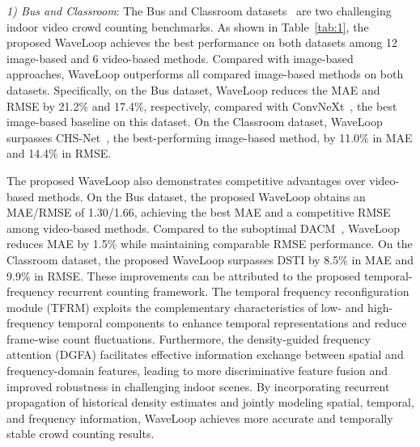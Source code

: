 \documentclass[lettersize,journal]{IEEEtran}
\begin{document}
\textit{1) Bus and Classroom}:
The Bus and Classroom datasets~\cite{ling2023motional} are two challenging indoor video crowd counting benchmarks. As shown in Table~\ref{tab:1}, the proposed WaveLoop achieves the best performance on both datasets among 12 image-based and 6 video-based methods. Compared with image-based approaches, WaveLoop outperforms all compared image-based methods on both datasets. Specifically, on the Bus dataset, WaveLoop reduces the MAE and RMSE by 21.2\% and 17.4\%, respectively, compared with ConvNeXt~\cite{liu2022convnet}, the best image-based baseline on this dataset. On the Classroom dataset, WaveLoop surpasses CHS-Net~\cite{dai2023cross}, the best-performing image-based method, by 11.0\% in MAE and 14.4\% in RMSE.

The proposed WaveLoop also demonstrates competitive advantages over video-based methods. On the Bus dataset, the proposed WaveLoop obtains an MAE/RMSE of 1.30/1.66, achieving the best MAE and a competitive RMSE among video-based methods. Compared to the suboptimal DACM~\cite{ling2025dual}, WaveLoop reduces MAE by 1.5\% while maintaining comparable RMSE performance. On the Classroom dataset, the proposed WaveLoop surpasses DSTI\cite{ling2026dual} by 8.5\% in MAE and 9.9\% in RMSE. These improvements can be attributed to the proposed temporal-frequency recurrent counting framework. The temporal frequency reconfiguration module (TFRM) exploits the complementary characteristics of low- and high-frequency temporal components to enhance temporal representations and reduce frame-wise count fluctuations. Furthermore, the density-guided frequency attention (DGFA) facilitates effective information exchange between spatial and frequency-domain features, leading to more discriminative feature fusion and improved robustness in challenging indoor scenes. By incorporating recurrent propagation of historical density estimates and jointly modeling spatial, temporal, and frequency information, WaveLoop achieves more accurate and temporally stable crowd counting results.
\end{document}
